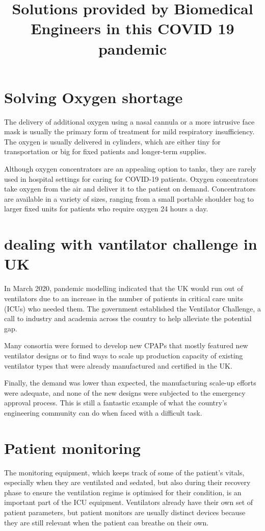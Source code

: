 \documentclass[15pt]{article}
\begin{document}
\pagestyle{fancy}
\tableofcontents
\empty

\title{Solutions provided by Biomedical Engineers in this COVID 19 pandemic}

\section{Solving Oxygen shortage}
The delivery of additional oxygen using a nasal cannula or a more 
intrusive face mask is usually the primary form of treatment for 
mild respiratory insufficiency. The oxygen is usually delivered in 
cylinders, which are either tiny for transportation or big for fixed
patients and longer-term supplies.

Although oxygen concentrators are an appealing option to tanks, they
are rarely used in hospital settings for caring for COVID-19 
patients. Oxygen concentrators take oxygen from the air and deliver 
it to the patient on demand. Concentrators are available in a 
variety of sizes, ranging from a small portable shoulder bag to 
larger fixed units for patients who require oxygen 24 hours a day.


\section{dealing with vantilator challenge in UK}
In March 2020, pandemic modelling indicated that the UK would run out of ventilators due to an increase in the number of patients in 
critical care units (ICUs) who needed them. The government 
established the Ventilator Challenge, a call to industry and academia across the country to help alleviate the potential gap.

Many consortia were formed to develop new CPAPs that mostly featured
new ventilator designs or to find ways to scale up production 
capacity of existing ventilator types that were already manufactured
and certified in the UK.

Finally, the demand was lower than expected, the manufacturing 
scale-up efforts were adequate, and none of the new designs were 
subjected to the emergency approval process. This is still a 
fantastic example of what the country's engineering community can do
when faced with a difficult task.


\section{Patient monitoring}
The monitoring equipment, which keeps track of some of the patient's
vitals, especially when they are ventilated and sedated, but also 
during their recovery phase to ensure the ventilation regime is 
optimised for their condition, is an important part of the ICU 
equipment. Ventilators already have their own set of patient 
parameters, but patient monitors are usually distinct devices because they are still relevant when the patient can breathe on their own.
\end{document}
